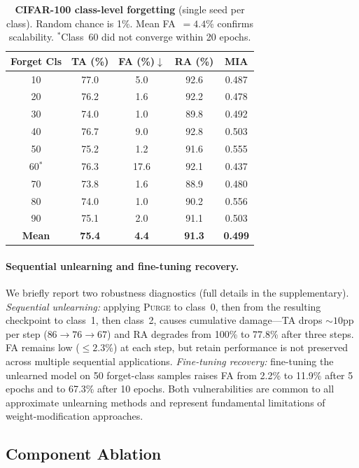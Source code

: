 \documentclass[letterpaper]{article} %
\newcommand{\ours}{\textsc{Purge}}
\begin{document}
\begin{table}[t]
\centering
\small
\setlength{\tabcolsep}{3.5pt}
\caption{\textbf{CIFAR-100 class-level forgetting} (single seed per class). Random chance is 1\%. Mean FA~$= 4.4$\% confirms scalability. $^*$Class~60 did not converge within 20 epochs.}
\label{tab:cifar100}
\begin{tabular}{@{}ccccc@{}}
\toprule
Forget Cls & TA (\%) & FA (\%)$\downarrow$ & RA (\%) & MIA \\
\midrule
10 & 77.0 & 5.0 & 92.6 & 0.487 \\
20 & 76.2 & 1.6 & 92.2 & 0.478 \\
30 & 74.0 & 1.0 & 89.8 & 0.492 \\
40 & 76.7 & 9.0 & 92.8 & 0.503 \\
50 & 75.2 & 1.2 & 91.6 & 0.555 \\
60$^*$ & 76.3 & 17.6 & 92.1 & 0.437 \\
70 & 73.8 & 1.6 & 88.9 & 0.480 \\
80 & 74.0 & 1.0 & 90.2 & 0.556 \\
90 & 75.1 & 2.0 & 91.1 & 0.503 \\
\midrule
\textbf{Mean} & \textbf{75.4} & \textbf{4.4} & \textbf{91.3} & \textbf{0.499} \\
\bottomrule
\end{tabular}
\end{table}

\paragraph{Sequential unlearning and fine-tuning recovery.}
We briefly report two robustness diagnostics (full details in the supplementary).
\emph{Sequential unlearning:} applying \ours{} to class~0, then from the resulting checkpoint to class~1, then class~2, causes cumulative damage---TA drops ${\sim}10$pp per step ($86 \to 76 \to 67$) and RA degrades from 100\% to 77.8\% after three steps. FA remains low ($\le 2.3$\%) at each step, but retain performance is not preserved across multiple sequential applications.
\emph{Fine-tuning recovery:} fine-tuning the unlearned model on 50 forget-class samples raises FA from 2.2\% to 11.9\% after 5 epochs and to 67.3\% after 10 epochs.
Both vulnerabilities are common to all approximate unlearning methods and represent fundamental limitations of weight-modification approaches.

\subsection{Component Ablation}
\end{document}
